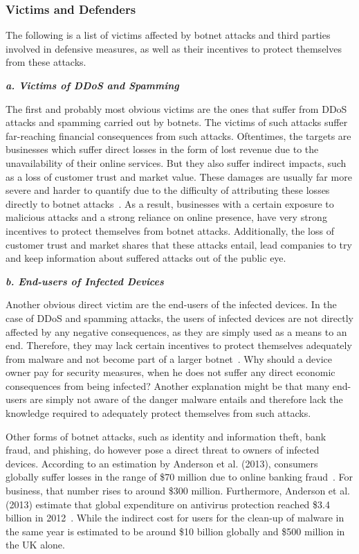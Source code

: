 \subsubsection{Victims and Defenders}
The following is a list of victims affected by botnet attacks and third parties involved in defensive measures, as well as their incentives to protect themselves from these attacks.

\textbf{\textit{a. Victims of DDoS and Spamming}}

The first and probably most obvious victims are the ones that suffer from DDoS attacks and spamming carried out by botnets.
The victims of such attacks suffer far-reaching financial consequences from such attacks.
Oftentimes, the targets are businesses which suffer direct losses in the form of lost revenue due to the unavailability of their online services.
But they also suffer indirect impacts, such as a loss of customer trust and market value.
These damages are usually far more severe and harder to quantify due to the difficulty of attributing these losses directly to botnet attacks~\cite{Anderson13}.
As a result, businesses with a certain exposure to malicious attacks and a strong reliance on online presence, have very strong incentives to protect themselves from botnet attacks.
Additionally, the loss of customer trust and market shares that these attacks entail, lead companies to try and keep information about suffered attacks out of the public eye.

\textbf{\textit{b. End-users of Infected Devices}}

Another obvious direct victim are the end-users of the infected devices.
In the case of DDoS and spamming attacks, the users of infected devices are not directly affected by any negative consequences, as they are simply used as a means to an end.
Therefore, they may lack certain incentives to protect themselves adequately from malware and not become part of a larger botnet~\cite{Asghari15}.
Why should a device owner pay for security measures, when he does not suffer any direct economic consequences from being infected?
Another explanation might be that many end-users are simply not aware of the danger malware entails and therefore lack the knowledge required to adequately protect themselves from such attacks.

Other forms of botnet attacks, such as identity and information theft, bank fraud, and phishing, do however pose a direct threat to owners of infected devices.
According to an estimation by Anderson et al. (2013), consumers globally suffer losses in the range of \$70 million due to online banking fraud~\cite{Anderson13}.
For business, that number rises to around \$300 million.
Furthermore, Anderson et al. (2013) estimate that global expenditure on antivirus protection reached \$3.4 billion in 2012~\cite{Anderson13}.
While the indirect cost for users for the clean-up of malware in the same year is estimated to be around \$10 billion globally and \$500 million in the UK alone.

